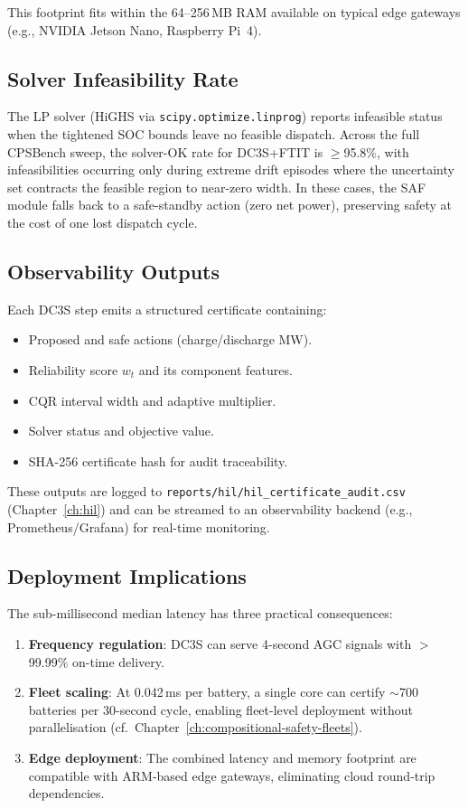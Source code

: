 This footprint fits within the 64--256\,MB RAM available on typical
edge gateways (e.g., NVIDIA Jetson Nano, Raspberry Pi~4).

\subsection{Solver Infeasibility Rate}

The LP solver (HiGHS via \texttt{scipy.optimize.linprog}) reports
infeasible status when the tightened SOC bounds leave no feasible
dispatch.  Across the full CPSBench sweep, the solver-OK rate for
DC3S+FTIT is $\ge$95.8\%, with infeasibilities occurring only during
extreme drift episodes where the uncertainty set contracts the
feasible region to near-zero width.  In these cases, the SAF module
falls back to a safe-standby action (zero net power), preserving
safety at the cost of one lost dispatch cycle.

\subsection{Observability Outputs}

Each DC3S step emits a structured certificate containing:
\begin{itemize}
  \item Proposed and safe actions (charge/discharge MW).
  \item Reliability score $w_t$ and its component features.
  \item CQR interval width and adaptive multiplier.
  \item Solver status and objective value.
  \item SHA-256 certificate hash for audit traceability.
\end{itemize}

These outputs are logged to \texttt{reports/hil/hil\_certificate\_audit.csv}
(Chapter~\ref{ch:hil}) and can be streamed to an observability backend
(e.g., Prometheus/Grafana) for real-time monitoring.

\subsection{Deployment Implications}

The sub-millisecond median latency has three practical consequences:

\begin{enumerate}
  \item \textbf{Frequency regulation}: DC3S can serve 4-second AGC
    signals with $>$99.99\% on-time delivery.
  \item \textbf{Fleet scaling}: At 0.042\,ms per battery, a single
    core can certify $\sim$700 batteries per 30-second cycle, enabling
    fleet-level deployment without parallelisation
    (cf.\ Chapter~\ref{ch:compositional-safety-fleets}).
  \item \textbf{Edge deployment}: The combined latency and memory
    footprint are compatible with ARM-based edge gateways, eliminating
    cloud round-trip dependencies.
\end{enumerate}

